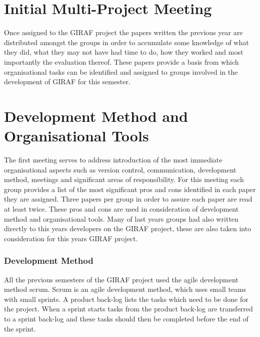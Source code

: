\section{Initial Multi-Project Meeting}
Once assigned to the GIRAF project the papers written the previous year are distributed amongst the groups in order to accumulate some knowledge of what they did, what they may not have had time to do, how they worked and most importantly the evaluation thereof.
These papers provide a basis from which organisational tasks can be identified and assigned to groups involved in the development of GIRAF for this semester.

\section{Development Method and Organisational Tools}
The first meeting serves to address introduction of the most immediate organisational aspects such as version control, communication, development method, meetings and significant areas of responsibility.
For this meeting each group provides a list of the most significant pros and cons identified in each paper they are assigned.
Three papers per group in order to assure each paper are read at least twice.
These pros and cons are used in consideration of development method and organisational tools.
Many of last years groups had also written directly to this years developers on the GIRAF project, these are also taken into consideration for this years GIRAF project. 

\subsubsection*{Development Method}
All the previous semesters of the GIRAF project used the agile development method scrum.
Scrum is an agile development method, which uses small teams with small sprints. 
A product back-log lists the tasks which need to be done for the project. 
When a sprint starts tasks from the product back-log are transferred to a sprint back-log and these tasks should then be completed before the end of the sprint.

